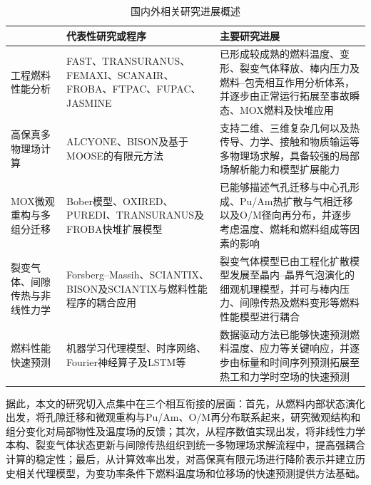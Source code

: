 \begin{table}[!htb]
	\centering
	\caption{国内外相关研究进展概述}
	\label{tab:research_status_summary}
	\renewcommand{\arraystretch}{1.25}
	\begin{tabularx}{\textwidth}{
			>{\raggedright\arraybackslash}p{2.4cm}
			>{\raggedright\arraybackslash}p{4.0cm}
			>{\raggedright\arraybackslash}X
		}
		\toprule
		{\centering 研究方向\par} &
		{\centering 代表性研究或程序\par} &
		{\centering 主要研究进展\par} \\
		\midrule
		
		工程燃料性能分析 &
		FAST、TRANSURANUS、FEMAXI、SCANAIR、FROBA、FTPAC、FUPAC、JASMINE &
		已形成较成熟的燃料温度、变形、裂变气体释放、棒内压力及燃料--包壳相互作用分析体系，并逐步由正常运行拓展至事故瞬态、MOX燃料及快堆应用 \\
		
		高保真多物理场计算 &
		ALCYONE、BISON及基于MOOSE的有限元方法 &
		支持二维、三维复杂几何以及热传导、力学、接触和物质输运等多物理场求解，具备较强的局部场解析能力和模型扩展能力 \\
		
		MOX微观重构与多组分迁移 &
		Bober模型、OXIRED、PUREDI、TRANSURANUS及FROBA快堆扩展模型 &
		已能够描述气孔迁移与中心孔形成、Pu/Am热扩散与气相迁移以及O/M径向再分布，并逐步考虑温度、燃耗和燃料组成等因素的影响 \\
		
		裂变气体、间隙传热与非线性力学 &
		Forsberg--Massih、SCIANTIX、BISON及SCIANTIX与燃料性能程序的耦合应用 &
		裂变气体模型已由工程化扩散模型发展至晶内--晶界气泡演化的细观机理模型，并可与棒内压力、间隙传热及燃料变形等燃料性能模型进行耦合 \\
		
		燃料性能快速预测 &
		机器学习代理模型、时序网络、Fourier神经算子及LSTM等 &
		数据驱动方法已能够快速预测燃料温度、应力等关键响应，并逐步由标量和时间序列预测拓展至热工和力学时空场的快速预测 \\
		
		\bottomrule
	\end{tabularx}
\end{table}

据此，本文的研究切入点集中在三个相互衔接的层面：首先，从燃料内部状态演化出发，将孔隙迁移和微观重构与Pu/Am、O/M再分布联系起来，研究微观结构和组分变化对局部物性及温度场的反馈；其次，从程序数值实现出发，将非线性力学本构、裂变气体状态更新与间隙传热组织到统一多物理场求解流程中，提高强耦合计算的稳定性；最后，从计算效率出发，对高保真有限元场进行降阶表示并建立历史相关代理模型，为变功率条件下燃料温度场和位移场的快速预测提供方法基础。

